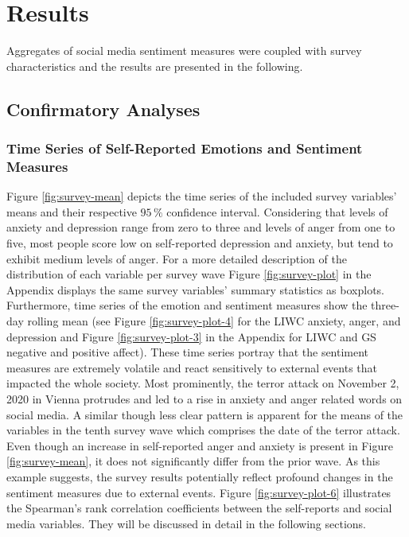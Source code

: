 \documentclass[
  english,
  jou,floatsintext]{apa7}
\begin{document}
\hypertarget{results}{%
\section{Results}\label{results}}

Aggregates of social media sentiment measures were coupled with survey characteristics and the results are presented in the following.

\hypertarget{confirmatory-analyses-1}{%
\subsection{Confirmatory Analyses}\label{confirmatory-analyses-1}}

\hypertarget{time-series-of-self-reported-emotions-and-sentiment-measures}{%
\subsubsection{Time Series of Self-Reported Emotions and Sentiment Measures}\label{time-series-of-self-reported-emotions-and-sentiment-measures}}

Figure \ref{fig:survey-mean} depicts the time series of the included survey variables' means and their respective \(95\,\%\) confidence interval. Considering that levels of anxiety and depression range from zero to three and levels of anger from one to five, most people score low on self-reported depression and anxiety, but tend to exhibit medium levels of anger.
For a more detailed description of the distribution of each variable per survey wave Figure \ref{fig:survey-plot} in the Appendix displays the same survey variables' summary statistics as boxplots. Furthermore, time series of the emotion and sentiment measures show the three-day rolling mean (see Figure \ref{fig:survey-plot-4} for the LIWC anxiety, anger, and depression and Figure \ref{fig:survey-plot-3} in the Appendix for LIWC and GS negative and positive affect).
These time series portray that the sentiment measures are extremely volatile and react sensitively to external events that impacted the whole society. Most prominently, the terror attack on November 2, 2020 in Vienna protrudes and led to a rise in anxiety and anger related words on social media. A similar though less clear pattern is apparent for the means of the variables in the tenth survey wave which comprises the date of the terror attack. Even though an increase in self-reported anger and anxiety is present in Figure \ref{fig:survey-mean}, it does not significantly differ from the prior wave.
As this example suggests, the survey results potentially reflect profound changes in the sentiment measures due to external events. Figure \ref{fig:survey-plot-6} illustrates the Spearman's rank correlation coefficients between the self-reports and social media variables. They will be discussed in detail in the following sections.
\end{document}
